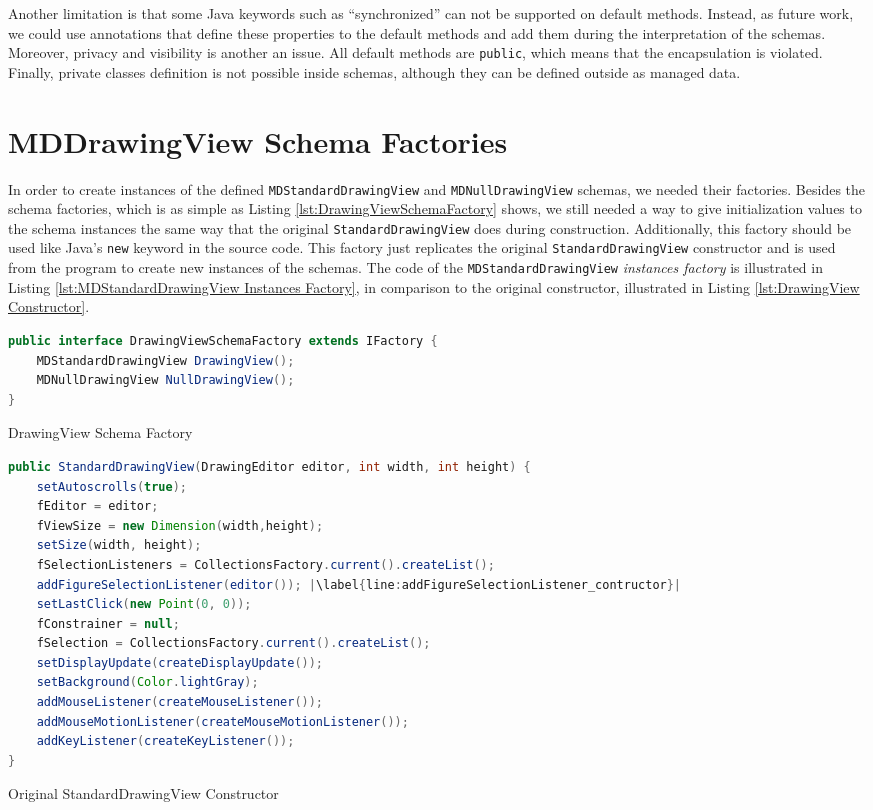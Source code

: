 Another limitation is that some Java keywords such as ``synchronized'' can not be supported on default methods.
Instead, as future work, we could use annotations that define these properties to the default methods and add them during the interpretation of the schemas.
Moreover, privacy and visibility is another an issue.
All default methods are \texttt{public}, which means that the encapsulation is violated.
Finally, private classes definition is not possible inside schemas, although they can be defined outside as managed data.

\section{MDDrawingView Schema Factories}
In order to create instances of the defined \texttt{MDStandardDrawingView} and \texttt{MDNullDrawingView} schemas, we needed their factories.
Besides the schema factories, which is as simple as Listing \ref{lst:DrawingViewSchemaFactory} shows, we still needed a way to give initialization values to the schema instances the same way that the original \texttt{StandardDrawingView} does during construction.
Additionally, this factory should be used like Java's \texttt{new} keyword in the source code.
This factory just replicates the original \texttt{StandardDrawingView} constructor and is used from the program to create new instances of the schemas.
The code of the \texttt{MDStandardDrawingView} \textit{instances factory} is illustrated in Listing \ref{lst:MDStandardDrawingView Instances Factory}, in comparison to the original constructor, illustrated in Listing \ref{lst:DrawingView Constructor}.

\begin{sourcecode}[H]
	\begin{lstlisting}[language=Java, escapechar=|]
public interface DrawingViewSchemaFactory extends IFactory {
	MDStandardDrawingView DrawingView();
	MDNullDrawingView NullDrawingView();
}
	\end{lstlisting}
	\caption{DrawingView Schema Factory}
	\label{lst:DrawingViewSchemaFactory}
\end{sourcecode}

\begin{sourcecode}[H]
	\begin{lstlisting}[language=Java, escapechar=|]
public StandardDrawingView(DrawingEditor editor, int width, int height) {
	setAutoscrolls(true);
	fEditor = editor;
	fViewSize = new Dimension(width,height);
	setSize(width, height);
	fSelectionListeners = CollectionsFactory.current().createList();
	addFigureSelectionListener(editor()); |\label{line:addFigureSelectionListener_contructor}|
	setLastClick(new Point(0, 0));
	fConstrainer = null;
	fSelection = CollectionsFactory.current().createList();
	setDisplayUpdate(createDisplayUpdate());
	setBackground(Color.lightGray);
	addMouseListener(createMouseListener());
	addMouseMotionListener(createMouseMotionListener());
	addKeyListener(createKeyListener());
}
	\end{lstlisting}
	\label{lst:DrawingView Constructor}
	\caption{Original StandardDrawingView Constructor}
\end{sourcecode}

